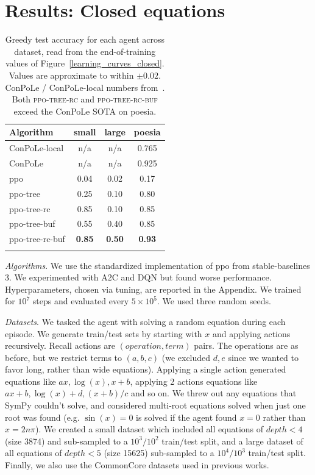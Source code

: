 \documentclass{article}
\theoremstyle{plain}
\theoremstyle{definition}
\theoremstyle{remark}
\begin{document}
\section{Results: Closed equations}
\label{sec:closed}
\begin{table}[t!]
\centering
\footnotesize
\caption{Greedy test accuracy for each agent across dataset, read from the end-of-training values of Figure~\ref{learning_curves_closed}. Values are approximate to within $\pm 0.02$. ConPoLe / ConPoLe-local numbers from~\cite{poesia2021contrastive}. Both \textsc{ppo-tree-rc} and \textsc{ppo-tree-rc-buf} exceed the ConPoLe SOTA on poesia.}
\begin{tabular}{l c c c}
\toprule
Algorithm & small & large & poesia \\
\midrule
ConPoLe-local     & n/a   & n/a   & 0.765 \\
ConPoLe           & n/a   & n/a   & 0.925 \\
\midrule
ppo               & 0.04  & 0.02  & 0.17  \\
ppo-tree          & 0.25  & 0.10  & 0.80  \\
ppo-tree-rc       & 0.85  & 0.10  & 0.85  \\
ppo-tree-buf      & 0.55  & 0.40  & 0.85  \\
ppo-tree-rc-buf   & \textbf{0.85} & \textbf{0.50} & \textbf{0.93} \\
\bottomrule
\label{tab:test_greedy}
\end{tabular}
\end{table}

\textit{Algorithms}. We use the standardized implementation of ppo from stable-baselines 3. We experimented with A2C and DQN but found worse performance. Hyperparameters, chosen via tuning, are reported in the Appendix. We trained for $10^7$ steps and evaluated every $5 \times 10^5$. We used three random seeds. 

\textit{Datasets}. We tasked the agent with solving a random equation during each episode. We generate train/test sets by starting with $x$ and applying actions recursively. Recall actions are $(operation, term)$ pairs. The operations are as before, but we restrict terms to $(a, b, c)$ (we excluded $d, e$ since we wanted to favor long, rather than wide equations). Applying a single action generated equations like $ax, \log(x), x+b$, applying 2 actions equations like $ax+b, \log(x)+d, (x+b)/c$ and so on. We threw out any equations that SymPy couldn't solve, and considered multi-root equations solved when just one root was found (e.g. $\sin(x) = 0$ is solved if the agent found $x=0$ rather than $x = 2 n \pi$). We created a small dataset which included all equations of $depth<4$ (size 3874) and sub-sampled to a $10^3/10^2$ train/test split, and a large dataset of all equations of $depth<5$ (size 15625) sub-sampled to a $10^4/10^3$ train/test split. Finally, we also use the CommonCore datasets used in previous works.
\end{document}

